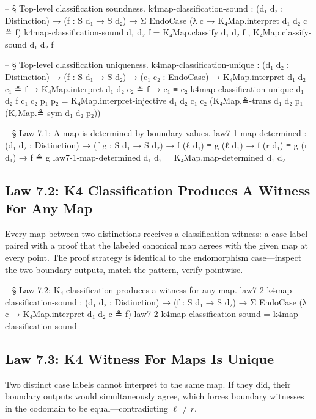 \documentclass[11pt,a4paper]{book}
\def\texorpdfstring#1#2{#2}%
\begin{document}
\begin{code}
-- § Top-level classification soundness.
k4map-classification-sound :
  (d₁ d₂ : Distinction) →
  (f : S d₁ → S d₂) →
  Σ EndoCase (λ c → K₄Map.interpret d₁ d₂ c ≗ f)
k4map-classification-sound d₁ d₂ f =
  K₄Map.classify d₁ d₂ f , K₄Map.classify-sound d₁ d₂ f

-- § Top-level classification uniqueness.
k4map-classification-unique :
  (d₁ d₂ : Distinction) →
  (f : S d₁ → S d₂) →
  (c₁ c₂ : EndoCase) →
  K₄Map.interpret d₁ d₂ c₁ ≗ f →
  K₄Map.interpret d₁ d₂ c₂ ≗ f →
  c₁ ≡ c₂
k4map-classification-unique d₁ d₂ f c₁ c₂ p₁ p₂ =
  K₄Map.interpret-injective d₁ d₂ c₁ c₂ (K₄Map.≗-trans d₁ d₂ p₁ (K₄Map.≗-sym d₁ d₂ p₂))

-- § Law 7.1: A map is determined by boundary values.
law7-1-map-determined :
  (d₁ d₂ : Distinction) →
  (f g : S d₁ → S d₂) →
  f (ℓ d₁) ≡ g (ℓ d₁) →
  f (r d₁) ≡ g (r d₁) →
  f ≗ g
law7-1-map-determined d₁ d₂ = K₄Map.map-determined d₁ d₂
\end{code}

\subsection{Law 7.2: K\texorpdfstring{$_4$}{4} Classification Produces A Witness For Any Map}

Every map between two distinctions receives a classification witness: a case label paired with a proof that the labeled canonical map agrees with the given map at every point. The proof strategy is identical to the endomorphism case—inspect the two boundary outputs, match the pattern, verify pointwise.

\begin{code}
-- § Law 7.2: K₄ classification produces a witness for any map.
law7-2-k4map-classification-sound :
  (d₁ d₂ : Distinction) →
  (f : S d₁ → S d₂) →
  Σ EndoCase (λ c → K₄Map.interpret d₁ d₂ c ≗ f)
law7-2-k4map-classification-sound = k4map-classification-sound
\end{code}

\subsection{Law 7.3: K\texorpdfstring{$_4$}{4} Witness For Maps Is Unique}

Two distinct case labels cannot interpret to the same map. If they did, their boundary outputs would simultaneously agree, which forces boundary witnesses in the codomain to be equal—contradicting $\ell \neq r$.
\end{document}
